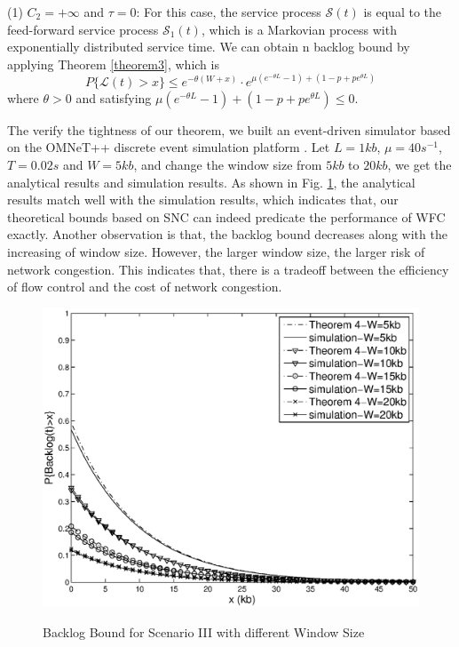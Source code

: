 \documentclass[paper]{ieice}
\begin{document}
(1) $C_2=+\infty$ and $\tau=0$: For this case, the service process $\mathcal{S}(t)$ is equal to the feed-forward service process $\mathcal{S}_1(t)$, which is a Markovian process with exponentially distributed service time. We can obtain n backlog bound by applying Theorem \ref{theorem3}, which is
\begin{equation*}\label{equation3}
P\{\mathcal{L}(t)>x\}\leq e^{-\theta(W+x)}\cdot e^{\mu(e^{-\theta L}-1)+(1-p+pe^{\theta L})}
\end{equation*}
where $\theta>0$ and satisfying $\mu(e^{-\theta L}-1)+(1-p+pe^{\theta L})\leq 0$.

The verify the tightness of our theorem, we built an event-driven simulator based on the OMNeT++ discrete event simulation platform \cite{omnetpp}. Let $L=1kb$, $\mu=40s^{-1}$, $T=0.02s$ and $W=5kb$, and change the window size from $5kb$ to $20kb$, we get the analytical results and simulation results. As shown in Fig. \ref{result1}, the analytical results match well with the simulation results, which indicates that, our theoretical bounds based on SNC can indeed predicate the performance of WFC exactly. Another observation is that, the backlog bound decreases along with the increasing of window size. However, the larger window size, the larger risk of network congestion. This indicates that, there is a tradeoff between the efficiency of flow control and the cost of network congestion.
\begin{figure}
  \centering
  \includegraphics[scale=0.45]{figures/backlogbuf.eps}\\
  \caption{Backlog Bound for Scenario III with different Window Size}\label{result1}
\end{figure}
\end{document}
